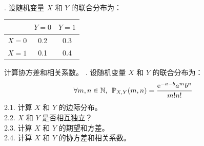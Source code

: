 \documentclass[12pt,UTF8,fontset=none]{ctexbook}
\begin{document}
\begin{xt}
    \mbox{} \\
    . 设随机变量 \(X\) 和 \(Y\) 的联合分布为：
    \begin{center}
        \begin{tabular}{c|cc}
            & \(Y=0\) & \(Y=1\) \\ \hline
            \(X=0\) & 0.2 & 0.3 \\
            \(X=1\) & 0.1 & 0.4
        \end{tabular}
    \end{center}
    计算协方差和相关系数。
    . 设随机变量 \(X\) 和 \(Y\) 的联合分布为：
    $$ \forall m, n\in \mathbb{N},\;\, \mathbb{P}_{X,Y}(m, n) = \frac{\mathrm{e}^{-a-b}a^mb^n}{m!n!} $$ 
    2.1. 计算 \(X\) 和 \(Y\) 的边际分布。\\
    2.2. \(X\) 和 \(Y\) 是否相互独立？\\
    2.3. 计算 \(X\) 和 \(Y\) 的期望和方差。\\
    2.4. 计算 \(X\) 和 \(Y\) 的协方差和相关系数。
\end{xt}












\end{document}
